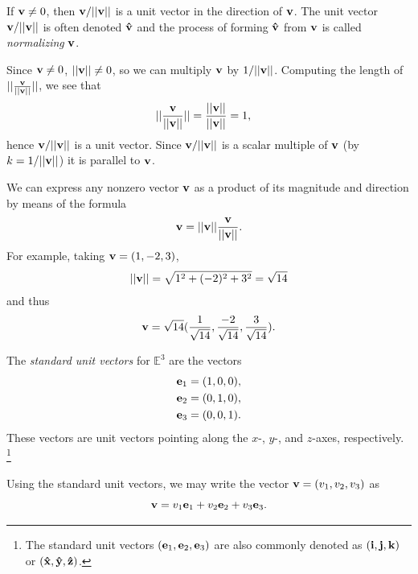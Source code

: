 \documentclass[12pt,letterpaper,reqno]{article}
\numberwithin{equation}{section}
\newcommand{\ti}[1]{\textit{#1}}
\begin{document}
\begin{prop}
	If ${\bf v}\neq 0$, then ${\bf v}/||{\bf v}||$ is a unit vector in the direction of ${\bf v}$. The unit vector ${\bf v}/||{\bf v}||$ is often denoted ${\bf \hat{v}}$ and the process of forming ${\bf \hat{v}}$ from ${\bf v}$ is called \ti{normalizing} ${\bf v}$.
\end{prop}

\begin{pf}
Since ${\bf v}\neq 0$, $||{\bf v}|| \neq 0$, so we can multiply ${\bf v}$ by $1/||{\bf v}||$. Computing the length of $||\frac{{\bf v}}{||{\bf v}||}||$, we see that 
\begin{align*}
	||\frac{{\bf v}}{||{\bf v}||}||&=\frac{||{\bf v}||}{||{\bf v}||}=1,
\end{align*} 
hence ${\bf v}/||{\bf v}||$ is a unit vector. Since ${\bf v}/||{\bf v}||$ is a scalar multiple of ${\bf v}$ (by $k=1/||{\bf v}||$) it is parallel to ${\bf v}$.
\end{pf}

\begin{example}
	We can express any nonzero vector ${\bf v}$ as a product of its magnitude and direction by means of the formula
	\begin{align*}
		{\bf v}=||{\bf v}||\frac{{\bf v}}{||{\bf v}||}.
	\end{align*}
	For example, taking ${\bf v}=(1,-2,3)$,
	\begin{align*}
		||{\bf v}||=\sqrt{1^2+(-2)^2+3^2}=\sqrt{14}
	\end{align*}
	and thus
	\begin{align*}
		{\bf v}=\sqrt{14}(\frac{1}{\sqrt{14}},\frac{-2}{\sqrt{14}},\frac{3}{\sqrt{14}}).
	\end{align*}
\end{example}


\begin{defn}
	 The \ti{standard unit vectors} for $\mathbb{E}^3$ are the vectors
	\begin{align*}
		{\bf e}_1&=(1,0,0), \\
		{\bf e}_2&=(0,1,0), \\
		{\bf e}_3&=(0,0,1). \\
	\end{align*}
These vectors are unit vectors pointing along the $x$-, $y$-, and $z$-axes, respectively. \footnote{The standard unit vectors $({\bf e}_1,{\bf e}_2,{\bf e}_3)$ are also commonly denoted as $({\bf i}, {\bf j}, {\bf k})$ or $({\bf \hat{x}}, {\bf \hat{y}}, {\bf \hat{z}})$.}	
\end{defn}
Using the standard unit vectors, we may write the vector ${\bf v}=(v_1,v_2,v_3)$ as $${\bf v}=v_1{\bf e}_1+v_2{\bf e}_2+v_3{\bf e}_3.$$
\end{document}
